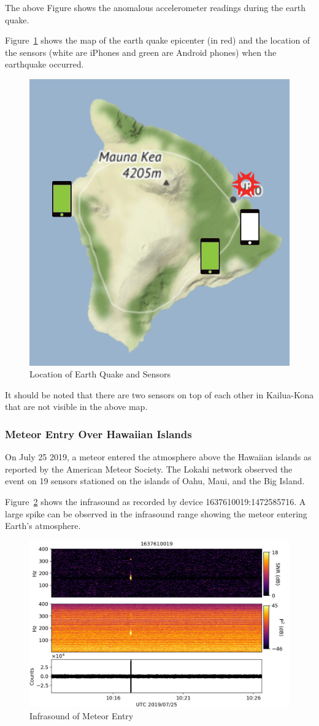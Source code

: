 The above Figure shows the anomalous accelerometer readings during the earth quake.

Figure~\ref{fig:quake_3} shows the map of the earth quake epicenter (in red) and the location of the sensors (white are iPhones and green are Android phones) when the earthquake occurred.

\begin{figure}[H]
    \centering
    \includegraphics[width=.50\linewidth]{figures/quake_3.png}
    \caption{Location of Earth Quake and Sensors}
    \label{fig:quake_3}
\end{figure}

It should be noted that there are two sensors on top of each other in Kailua-Kona that are not visible in the above map.

\subsubsection{Meteor Entry Over Hawaiian Islands}
On July 25 2019, a meteor entered the atmosphere above the Hawaiian islands as reported by the American Meteor Society\cite{ams}. The Lokahi network observed the event on 19 sensors stationed on the islands of Oahu, Maui, and the Big Island.

Figure~\ref{fig:meteor_1} shows the infrasound as recorded by device 1637610019:1472585716. A large spike can be observed in the infrasound range showing the meteor entering Earth's atmosphere.

\begin{figure}[H]
    \centering
    \includegraphics[width=\linewidth]{figures/meteor_1.png}
    \caption{Infrasound of Meteor Entry}
    \label{fig:meteor_1}
\end{figure}


